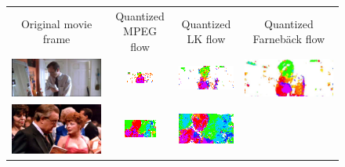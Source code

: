 \begin{figure}[t!]
\begin{center}
\hspace*{-.2cm}
\begin{tabular}{cccc}
\small Original movie frame & \small Quantized MPEG flow & \small Quantized LK flow & \small Quantized Farneb\"ack flow \\
\includegraphics[width=.23\textwidth]{cvpr14_figures/flow/actioncliptrain00009_0010bright.jpg} &
\includegraphics[width=.23\textwidth]{cvpr14_figures/flow/flow_actioncliptrain00009_frame010_mpeg_quant.png} & 
\includegraphics[width=.23\textwidth]{cvpr14_figures/flow/flow_actioncliptrain00009_frame010_stip_quant.png} &
\includegraphics[width=.23\textwidth]{cvpr14_figures/flow/flow_actioncliptrain00009_frame010_traj_quant.jpeg}\\
\includegraphics[width=.23\textwidth]{cvpr14_figures/flow/flow_actioncliptest00686_frame010.jpeg} & 
\includegraphics[width=.23\textwidth]{cvpr14_figures/flow/flow_actioncliptest00686_frame010_mv_quant.png} & 
\includegraphics[width=.23\textwidth]{cvpr14_figures/flow/flow_actioncliptest00686_frame010_stip_quant.png} & 

\end{tabular}
\end{center}
\end{figure}
